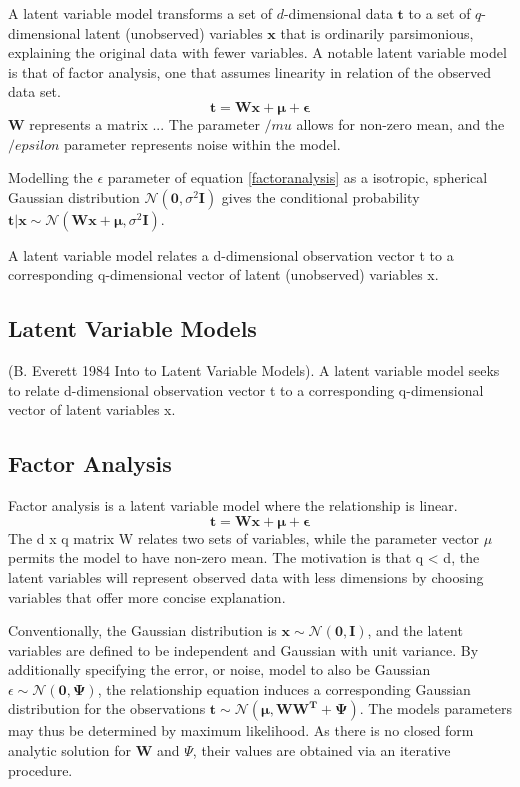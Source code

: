 \documentclass[ %
                    author={Dillon Keith Diep},
                supervisor={Dr. Carl Henrik Ek},
                    degree={MEng},
                     title={Assisted Content Generation for 3D Hair Geometry},
                  subtitle={[INCOMPLETE DRAFT, CONTAINS NOTES FROM RESEARCH]},
                      type={Research},
                      year={2014} ]{dissertation}
\begin{document}
A latent variable model transforms a set of $d$-dimensional data $\mathbf{t}$ to a set of $q$-dimensional latent (unobserved) variables $\mathbf{x}$ that is ordinarily parsimonious, explaining the original data with fewer variables. A notable latent variable model is that of factor analysis, one that assumes linearity in relation of the observed data set.
\begin{equation} \label{factoranalysis}
	\mathbf{t=Wx+\mu+\epsilon}
\end{equation}
$\mathbf{W}$ represents a matrix ...
The parameter $/mu$ allows for non-zero mean, and the $/epsilon$ parameter represents noise within the model.

Modelling the $\epsilon$ parameter of equation \ref{factoranalysis} as a isotropic, spherical Gaussian distribution $\mathcal{N}(\mathbf{0},\sigma^2\mathbf{I})$ gives the conditional probability $\mathbf{t|x}\sim\mathcal{N}(\mathbf{Wx+\mu},\sigma^2\mathbf{I})$. 



A latent variable model relates a d-dimensional observation vector t to a corresponding q-dimensional vector of latent (unobserved) variables x.

\subsection{Latent Variable Models}
(B. Everett 1984 Into to Latent Variable Models).	
A latent variable model seeks to relate d-dimensional observation vector t to a corresponding q-dimensional vector of latent variables x.

\subsection{Factor Analysis}
Factor analysis is a latent variable model where the relationship is linear.
\begin{equation}
	\mathbf{t=Wx+\mu+\epsilon}
\end{equation}
The d x q matrix W relates two sets of variables, while the parameter vector $\mu$ permits the model to have non-zero mean. The motivation is that q < d, the latent variables will represent observed data with less dimensions by choosing variables that offer more concise explanation. 

Conventionally, the Gaussian distribution is $\mathbf{x}\sim\mathcal{N}(\mathbf{0,I})$, and the latent variables are defined to be independent and Gaussian with unit variance. By additionally specifying the error, or noise, model to also be Gaussian $\epsilon \sim\mathcal{N}(\mathbf{0, \Psi})$, the relationship equation induces a corresponding Gaussian distribution for the observations
$\mathbf{t\sim\mathcal{N}(\mu, \mathbf{WW}^T+\Psi)}$. The models parameters may thus be determined by maximum likelihood. As there is no closed form analytic solution for $\mathbf{W}$ and $\Psi$, their values are obtained via an iterative procedure.
\end{document}
